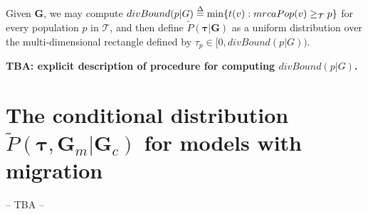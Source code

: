 \documentclass[11pt]{article}
\newcommand{\vect}[1]{\boldsymbol{\mathbf{#1}}}
\newcommand{\Tr}{\mathcal{T}}
\newcommand{\G}{\vect{G}}
\newcommand{\Pref}{\widetilde{P}}
\newcommand{\1}{\mathbbm{1}}
\newcommand{\Gc}{\G_c}
\newcommand{\Gm}{\G_m}
\newcommand{\eqdef}{\stackrel{\Delta}{=}}
\newcommand{\taus}{\vect\tau}
\begin{document}
Given $\G$, we may compute $divBound(p|G) \eqdef \min \{t(v):mrcaPop(v)\anc p\}$ for every population $p$ in $\Tr$, and then define $\Pref(\taus|\G)$ as a uniform distribution over the
multi-dimensional rectangle defined by $\tau_p \in [0,divBound(p|G))$.

\textbf{TBA: explicit description of procedure for computing $divBound(p|G)$.}

\section{\texorpdfstring{The conditional distribution  $\Pref(\taus,\Gm|\Gc)$ for models with migration}{Conditional distribution with migration}}\label{ap:cond_mig}

-- TBA --
\end{document}
